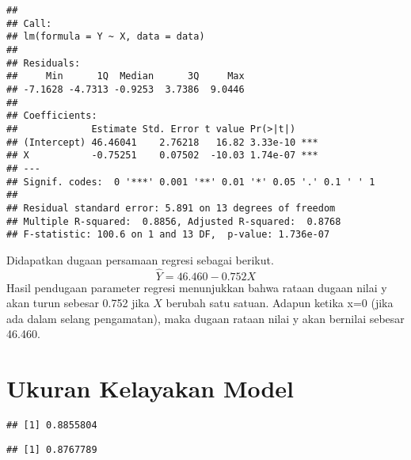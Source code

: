 \documentclass[
]{article}
\newenvironment{Shaded}{\begin{snugshade}}{\end{snugshade}}
\newcommand{\FunctionTok}[1]{\textcolor[rgb]{0.13,0.29,0.53}{\textbf{#1}}}
\newcommand{\NormalTok}[1]{#1}
\newcommand{\OtherTok}[1]{\textcolor[rgb]{0.56,0.35,0.01}{#1}}
\newcommand{\SpecialCharTok}[1]{\textcolor[rgb]{0.81,0.36,0.00}{\textbf{#1}}}
\begin{document}
\begin{verbatim}
## 
## Call:
## lm(formula = Y ~ X, data = data)
## 
## Residuals:
##     Min      1Q  Median      3Q     Max 
## -7.1628 -4.7313 -0.9253  3.7386  9.0446 
## 
## Coefficients:
##             Estimate Std. Error t value Pr(>|t|)    
## (Intercept) 46.46041    2.76218   16.82 3.33e-10 ***
## X           -0.75251    0.07502  -10.03 1.74e-07 ***
## ---
## Signif. codes:  0 '***' 0.001 '**' 0.01 '*' 0.05 '.' 0.1 ' ' 1
## 
## Residual standard error: 5.891 on 13 degrees of freedom
## Multiple R-squared:  0.8856, Adjusted R-squared:  0.8768 
## F-statistic: 100.6 on 1 and 13 DF,  p-value: 1.736e-07
\end{verbatim}

Didapatkan dugaan persamaan regresi sebagai berikut. \[
\hat Y = 46.460 - 0.752X
\] Hasil pendugaan parameter regresi menunjukkan bahwa rataan dugaan
nilai y akan turun sebesar 0.752 jika \(X\) berubah satu satuan. Adapun
ketika x=0 (jika ada dalam selang pengamatan), maka dugaan rataan nilai
y akan bernilai sebesar 46.460.

\hypertarget{ukuran-kelayakan-model}{%
\section{Ukuran Kelayakan Model}\label{ukuran-kelayakan-model}}

\begin{Shaded}
\end{Shaded}

\begin{verbatim}
## [1] 0.8855804
\end{verbatim}

\begin{Shaded}
\end{Shaded}

\begin{verbatim}
## [1] 0.8767789
\end{verbatim}
\end{document}
